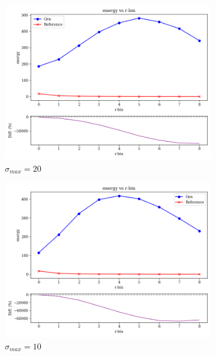 \begin{figure}[bthp]
    \centering
    \begin{subfigure}[b]{0.23\textwidth}
        \centering
        \includegraphics[width=\textwidth]{Figures/vp20_2.png}
        \caption{$\sigma_{max}=20$}
        \label{fig:vp20_2}
    \end{subfigure}
    \hfill
    \begin{subfigure}[b]{0.23\textwidth}
        \centering
        \includegraphics[width=\textwidth]{Figures/vp10_2.png}
        \caption{$\sigma_{max}=10$}
        \label{fig:vp10_2}
    \end{subfigure}
    \hfill
    \begin{subfigure}[b]{0.23\textwidth}

\end{subfigure}
\end{figure}

